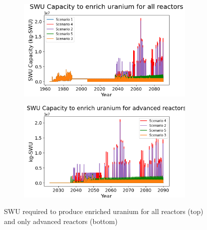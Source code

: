 \begin{frame}
\begin{columns}
\begin{itemize}
            \end{itemize}
        \column[t]{5cm}
        \vspace{-1cm}
        \begin{figure}
            \centering 
            \begin{subfigure}
                \centering
                \includegraphics[height=0.35\textheight]{figures/totalswu_scenarios_all.png}
                \label{fig:swu_all}
            \end{subfigure}
            \vspace{-0.5cm}
            \begin{subfigure}
                \centering
                \includegraphics[height=0.35\textheight]{figures/haleuSWU_scenarios_all.png}
                \label{fig:swu_haleu}
            \end{subfigure}
            \caption{\gls{SWU} required to produce enriched uranium for all 
            reactors (top) and only advanced reactors (bottom)}
            \label{fig:swu}
        \end{figure}
    \end{columns}
    

\end{frame}
